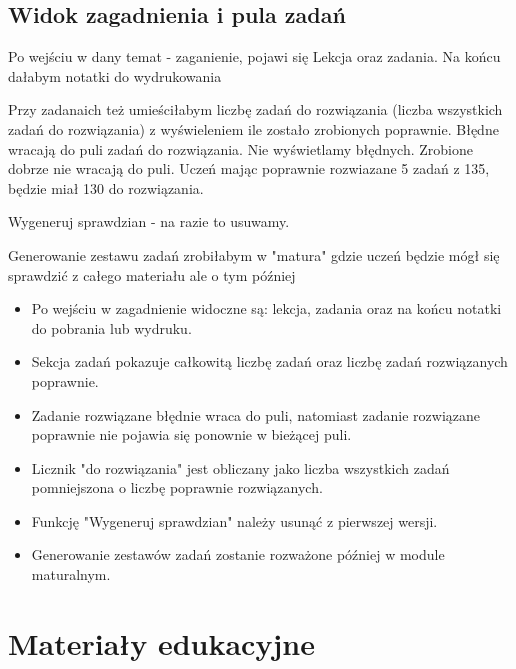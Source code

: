 \documentclass[12pt,a4paper]{report}
\begin{document}
\section{Widok zagadnienia i pula zadań}
\begin{ElearnReviewComment}[title={Komentarz nr 6 -- Anna Kogut, 2026-07-22}]
Po wejściu w dany temat - zaganienie, pojawi się Lekcja oraz zadania. Na końcu dałabym notatki do wydrukowania

Przy zadanaich też umieściłabym liczbę zadań do rozwiązania (liczba wszystkich zadań do rozwiązania) z wyświeleniem ile zostało zrobionych poprawnie. Błędne wracają do puli zadań do rozwiązania. Nie wyświetlamy błędnych. Zrobione dobrze nie wracają do puli. Uczeń mając poprawnie rozwiazane 5 zadań z 135, będzie miał 130 do rozwiązania.

Wygeneruj sprawdzian - na razie to usuwamy.

Generowanie zestawu zadań zrobiłabym w "matura" gdzie uczeń będzie mógł się sprawdzić z całego materiału ale o tym później
\end{ElearnReviewComment}
\begin{ElearnRequirement}[title={Wymagania wynikające z komentarza}]
\begin{itemize}
  \item Po wejściu w zagadnienie widoczne są: lekcja, zadania oraz na końcu notatki do pobrania lub wydruku.
  \item Sekcja zadań pokazuje całkowitą liczbę zadań oraz liczbę zadań rozwiązanych poprawnie.
  \item Zadanie rozwiązane błędnie wraca do puli, natomiast zadanie rozwiązane poprawnie nie pojawia się ponownie w bieżącej puli.
  \item Licznik "do rozwiązania" jest obliczany jako liczba wszystkich zadań pomniejszona o liczbę poprawnie rozwiązanych.
  \item Funkcję "Wygeneruj sprawdzian" należy usunąć z pierwszej wersji.
  \item Generowanie zestawów zadań zostanie rozważone później w module maturalnym.
\end{itemize}
\end{ElearnRequirement}
\clearpage
\chapter{Materiały edukacyjne}
\end{document}
